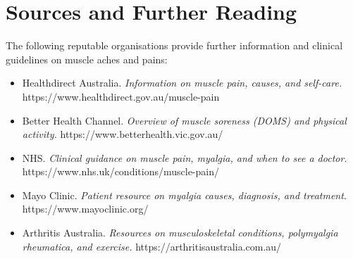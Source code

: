 \section*{Sources and Further Reading}
The following reputable organisations provide further information and clinical guidelines on muscle aches and pains:
\begin{itemize}
    \item Healthdirect Australia. \textit{Information on muscle pain, causes, and self-care.} https://www.healthdirect.gov.au/muscle-pain
    \item Better Health Channel. \textit{Overview of muscle soreness (DOMS) and physical activity.} https://www.betterhealth.vic.gov.au/
    \item NHS. \textit{Clinical guidance on muscle pain, myalgia, and when to see a doctor.} https://www.nhs.uk/conditions/muscle-pain/
    \item Mayo Clinic. \textit{Patient resource on myalgia causes, diagnosis, and treatment.} https://www.mayoclinic.org/
    \item Arthritis Australia. \textit{Resources on musculoskeletal conditions, polymyalgia rheumatica, and exercise.} https://arthritisaustralia.com.au/
\end{itemize}
